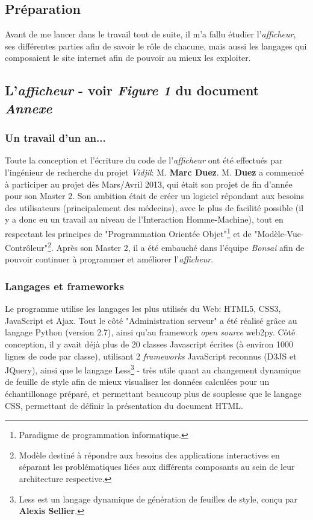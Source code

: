 \documentclass[12pt]{report}
\begin{document}
\begin{spacing}{1.2}
\chapter{Préparation}

Avant de me lancer dans le travail tout de suite, il m'a fallu étudier l'\textit{afficheur}, ses différentes parties afin de savoir le rôle de chacune, mais aussi les langages qui composaient le site internet afin de pouvoir au mieux les exploiter.

\section{L'\textit{afficheur}  - voir \textit{Figure 1} du document \textit{Annexe}}

\subsection{Un travail d'un an...}
Toute la conception et l'écriture du code de l'\textit{afficheur} ont été effectués par l'ingénieur de recherche du projet \textit{Vidjil}: M. \textbf{Marc Duez}.
\newline
M. \textbf{Duez} a commencé à participer au projet dès Mars/Avril 2013, qui était son projet de fin d'année pour son Master 2.
\newline
Son ambition était de créer un logiciel répondant aux besoins des utilisateurs (principalement des médecins), avec le plus de facilité possible (il y a donc eu un travail au niveau de l'Interaction Homme-Machine), tout en respectant les principes de "Programmation Orientée Objet"\footnote{Paradigme de programmation informatique.} et de "Modèle-Vue-Contrôleur"\footnote{Modèle destiné à répondre aux besoins des applications interactives en séparant les problématiques liées aux différents composants au sein de leur architecture respective.}.
\newline
Après son Master 2, il a été embauché dans l'équipe \textit{Bonsai} afin de pouvoir continuer à programmer et améliorer l'\textit{afficheur}.

\subsection{Langages et frameworks}
Le programme utilise les langages les plus utilisés du Web: HTML5, CSS3, JavaScript et Ajax.
\newline
Tout le côté "Administration serveur" a été réalisé grâce au langage Python (version 2.7), ainsi qu'au framework \textit{open source} web2py.
\newline
Côté conception, il y avait déjà plus de 20 classes Javascript écrites (à environ 1000 lignes de code par classe), utilisant 2 \textit{frameworks} JavaScript reconnus (D3JS et JQuery), ainsi que le langage Less\footnote{Less est un langage dynamique de génération de feuilles de style, conçu par \textbf{Alexis Sellier}.} - très utile quant au changement dynamique de feuille de style afin de mieux visualiser les données calculées pour un échantillonage préparé, et permettant beaucoup plus de souplesse que le langage CSS, permettant de définir la présentation du document HTML.


\end{spacing}
\end{document}
